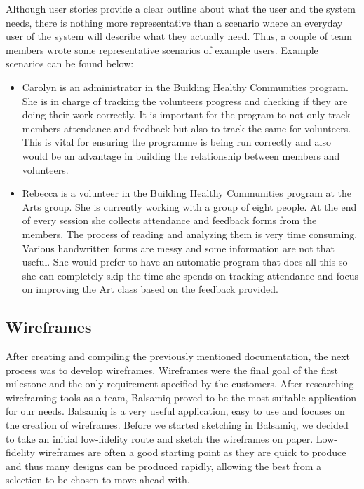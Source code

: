 \documentclass{l3proj}
\begin{document}
Although user stories provide a clear outline about what the user and the system needs, there is nothing more representative than a scenario where an everyday user of the system will describe what they actually need. Thus, a couple of team members wrote some representative scenarios of example users.
Example scenarios can be found below:
\begin{itemize}
\item Carolyn is an administrator in the Building Healthy Communities program. She is in charge of tracking the volunteers progress and checking if they are doing their work correctly. It is important for the program to not only track members attendance and feedback but also to track the same for volunteers. This is vital for ensuring the programme is being run correctly and also would be an advantage in building the relationship between members and volunteers.

\item Rebecca is a volunteer in the Building Healthy Communities program at the Arts group. She is currently working with a group of eight people. At the end of every session she collects attendance and feedback forms from the members. The process of reading and analyzing them is very time consuming. Various handwritten forms are messy and some information are not that useful. She would prefer to have an automatic program that does all this so she can completely skip the time she spends on tracking attendance and focus on improving the Art class based on the feedback provided.

\end{itemize}

\subsection{Wireframes}
\label{wireframes}

After creating and compiling the previously mentioned documentation, the next process was to develop wireframes. Wireframes were the final goal of the first milestone and the only requirement specified by the customers. After researching wireframing tools as a team, Balsamiq proved to be the most suitable application for our needs. Balsamiq is a very useful application, easy to use and focuses on the creation of wireframes. Before we started sketching in Balsamiq, we decided to take an initial low-fidelity route and sketch the wireframes on paper. Low-fidelity wireframes are often a good starting point as they are quick to produce and thus many designs can be produced rapidly, allowing the best from a selection to be chosen to move ahead with.
\end{document}
